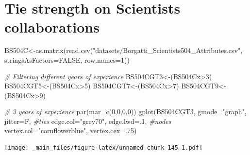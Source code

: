 \documentclass[
  notitlepage,
  onecolumn,
  openany]{book}
\newenvironment{Shaded}{\begin{snugshade}}{\end{snugshade}}
\newcommand{\AttributeTok}[1]{\textcolor[rgb]{0.77,0.63,0.00}{#1}}
\newcommand{\CommentTok}[1]{\textcolor[rgb]{0.56,0.35,0.01}{\textit{#1}}}
\newcommand{\ConstantTok}[1]{\textcolor[rgb]{0.00,0.00,0.00}{#1}}
\newcommand{\DecValTok}[1]{\textcolor[rgb]{0.00,0.00,0.81}{#1}}
\newcommand{\FunctionTok}[1]{\textcolor[rgb]{0.00,0.00,0.00}{#1}}
\newcommand{\NormalTok}[1]{#1}
\newcommand{\OtherTok}[1]{\textcolor[rgb]{0.56,0.35,0.01}{#1}}
\newcommand{\SpecialCharTok}[1]{\textcolor[rgb]{0.00,0.00,0.00}{#1}}
\newcommand{\StringTok}[1]{\textcolor[rgb]{0.31,0.60,0.02}{#1}}
\begin{document}
\hypertarget{tie-strength-on-scientists-collaborations}{%
\section{Tie strength on Scientists collaborations}\label{tie-strength-on-scientists-collaborations}}

\begin{Shaded}
\begin{Highlighting}[]
\NormalTok{BS504C}\OtherTok{\textless{}{-}}\FunctionTok{as.matrix}\NormalTok{(}\FunctionTok{read.csv}\NormalTok{(}\StringTok{"datasets/Borgatti\_Scientists504\_Attributes.csv"}\NormalTok{,}
                           \AttributeTok{stringsAsFactors=}\ConstantTok{FALSE}\NormalTok{, }\AttributeTok{row.names=}\DecValTok{1}\NormalTok{))}

\CommentTok{\# Filtering different years of experience}
\NormalTok{BS504CGT3}\OtherTok{\textless{}{-}}\NormalTok{(BS504Cx}\SpecialCharTok{\textgreater{}}\DecValTok{3}\NormalTok{)}
\NormalTok{BS504CGT5}\OtherTok{\textless{}{-}}\NormalTok{(BS504Cx}\SpecialCharTok{\textgreater{}}\DecValTok{5}\NormalTok{)}
\NormalTok{BS504CGT7}\OtherTok{\textless{}{-}}\NormalTok{(BS504Cx}\SpecialCharTok{\textgreater{}}\DecValTok{7}\NormalTok{)}
\NormalTok{BS504CGT9}\OtherTok{\textless{}{-}}\NormalTok{(BS504Cx}\SpecialCharTok{\textgreater{}}\DecValTok{9}\NormalTok{)}
\end{Highlighting}
\end{Shaded}

\begin{Shaded}
\begin{Highlighting}[]
\CommentTok{\# 3 years of experience}
\FunctionTok{par}\NormalTok{(}\AttributeTok{mar=}\FunctionTok{c}\NormalTok{(}\DecValTok{0}\NormalTok{,}\DecValTok{0}\NormalTok{,}\DecValTok{0}\NormalTok{,}\DecValTok{0}\NormalTok{))}
\FunctionTok{gplot}\NormalTok{(BS504CGT3,}
      \AttributeTok{gmode=}\StringTok{"graph"}\NormalTok{,}
      \AttributeTok{jitter=}\NormalTok{F,}
      \CommentTok{\#ties}
      \AttributeTok{edge.col=}\StringTok{"grey70"}\NormalTok{, }
      \AttributeTok{edge.lwd=}\NormalTok{.}\DecValTok{1}\NormalTok{,}
      \CommentTok{\#nodes}
      \AttributeTok{vertex.col=}\StringTok{"cornflowerblue"}\NormalTok{,}
      \AttributeTok{vertex.cex=}\NormalTok{.}\DecValTok{75}\NormalTok{)}
\end{Highlighting}
\end{Shaded}

\texttt{[image: \_main\_files/figure-latex/unnamed-chunk-145-1.pdf]}
\end{document}
